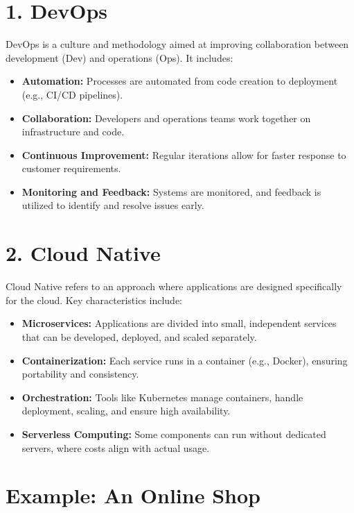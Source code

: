 \section{1. DevOps}

DevOps is a culture and methodology aimed at improving collaboration between development (Dev) and operations (Ops). It includes:

\begin{itemize}
    \item \textbf{Automation:} Processes are automated from code creation to deployment (e.g., CI/CD pipelines).
    \item \textbf{Collaboration:} Developers and operations teams work together on infrastructure and code.
    \item \textbf{Continuous Improvement:} Regular iterations allow for faster response to customer requirements.
    \item \textbf{Monitoring and Feedback:} Systems are monitored, and feedback is utilized to identify and resolve issues early.
\end{itemize}

\section{2. Cloud Native}

Cloud Native refers to an approach where applications are designed specifically for the cloud. Key characteristics include:

\begin{itemize}
    \item \textbf{Microservices:} Applications are divided into small, independent services that can be developed, deployed, and scaled separately.
    \item \textbf{Containerization:} Each service runs in a container (e.g., Docker), ensuring portability and consistency.
    \item \textbf{Orchestration:} Tools like Kubernetes manage containers, handle deployment, scaling, and ensure high availability.
    \item \textbf{Serverless Computing:} Some components can run without dedicated servers, where costs align with actual usage.
\end{itemize}

\newpage

\section{Example: An Online Shop}

